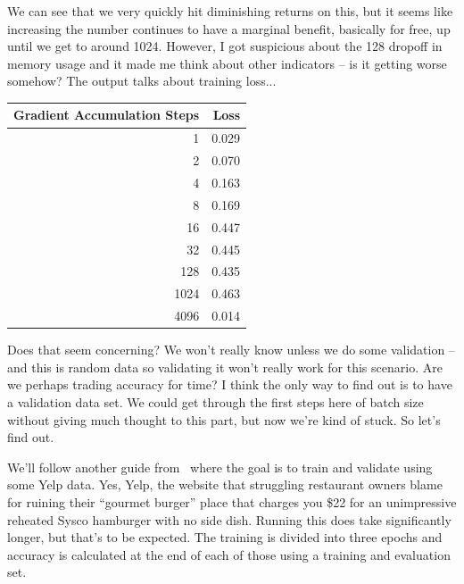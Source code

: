 We can see that we very quickly hit diminishing returns on this, but it seems like increasing the number continues to have a marginal benefit, basically for free, up until we get to around 1024. However, I got suspicious about the 128 dropoff in memory usage and it made me think about other indicators -- is it getting worse somehow? The output talks about training loss...

\begin{center}
\begin{tabular}{r|r}
\textbf{Gradient Accumulation Steps} & \textbf{Loss} \\ \hline
1 & 0.029 \\
2 & 0.070 \\
4 & 0.163 \\
8 & 0.169 \\
16 & 0.447 \\
32 & 0.445 \\
128 & 0.435 \\
1024 & 0.463 \\
4096 & 0.014 \\
\end{tabular}
\end{center}

Does that seem concerning? We won't really know unless we do some validation -- and this is random data so validating it won't really work for this scenario. Are we perhaps trading accuracy for time? I think the only way to find out is to have a validation data set. We could get through the first steps here of batch size without giving much thought to this part, but now we're kind of stuck. So let's find out.

We'll follow another guide from~\cite{hf3} where the goal is to train and validate using some Yelp data. Yes, Yelp, the website that struggling restaurant owners blame for ruining their ``gourmet burger'' place that charges you \$22 for an unimpressive reheated Sysco hamburger with no side dish. Running this does take significantly longer, but that's to be expected. The training is divided into three epochs and accuracy is calculated at the end of each of those using a training and evaluation set.

